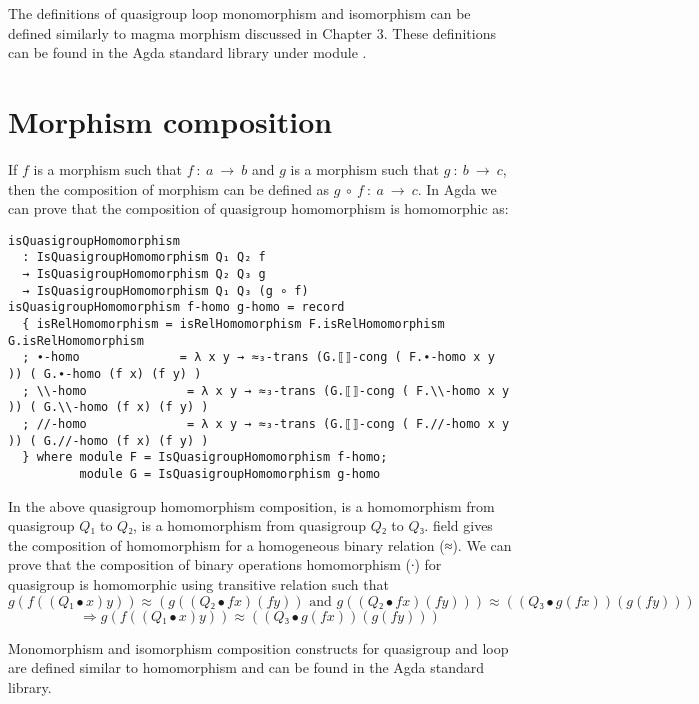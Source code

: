 The definitions of quasigroup loop monomorphism and isomorphism can be defined
similarly to magma morphism discussed in Chapter 3. These definitions can be
found in the Agda standard library under module
.

\section{Morphism composition}
If $f$ is a morphism such that $f\ :\ a \ \rightarrow \ b$ and $g$ is a morphism
such that $g\ :\ b\ \rightarrow \ c$, then the composition of morphism can be
defined as $g \ ∘\ f\ :\ a \ \rightarrow \ c$. In Agda we can prove that the
composition of quasigroup homomorphism is homomorphic as:

\begin{verbatim}
isQuasigroupHomomorphism
  : IsQuasigroupHomomorphism Q₁ Q₂ f
  → IsQuasigroupHomomorphism Q₂ Q₃ g
  → IsQuasigroupHomomorphism Q₁ Q₃ (g ∘ f)
isQuasigroupHomomorphism f-homo g-homo = record
  { isRelHomomorphism = isRelHomomorphism F.isRelHomomorphism G.isRelHomomorphism
  ; ∙-homo              = λ x y → ≈₃-trans (G.⟦⟧-cong ( F.∙-homo x y )) ( G.∙-homo (f x) (f y) )
  ; \\-homo              = λ x y → ≈₃-trans (G.⟦⟧-cong ( F.\\-homo x y )) ( G.\\-homo (f x) (f y) )
  ; //-homo              = λ x y → ≈₃-trans (G.⟦⟧-cong ( F.//-homo x y )) ( G.//-homo (f x) (f y) )
  } where module F = IsQuasigroupHomomorphism f-homo; 
          module G = IsQuasigroupHomomorphism g-homo
\end{verbatim}

In the above quasigroup homomorphism composition,  is a homomorphism
from quasigroup $Q₁$ to $Q₂$,  is a homomorphism from quasigroup $Q₂$ to $Q₃$.
 field gives the composition of homomorphism for a
homogeneous binary relation (≈). We can prove that the composition of binary
operations homomorphism (∙) for quasigroup is homomorphic using transitive
relation  such that \[g (f ((Q₁ ∙ x) y)) ≈ (g ((Q₂ ∙ f x) (f
y)) \text{ and } g ((Q₂ ∙ f x) (f y))) ≈ ((Q₃ ∙ g (f x)) (g (f y)))\]
\[\Rightarrow g (f ((Q₁ ∙ x) y)) ≈ ((Q₃ ∙ g (f x)) (g (f y)))\]

Monomorphism and isomorphism composition constructs for quasigroup and loop are
defined similar to homomorphism and can be found in the Agda standard library.


